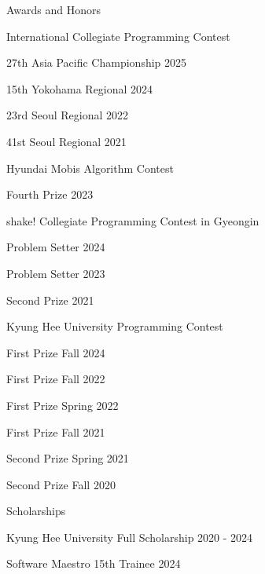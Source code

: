 \documentclass{resume}
\begin{document}
\begin{rSection}{Awards and Honors}

  \begin{rSubsection}{International Collegiate Programming Contest}{}{}{}
    \item 27th \hfill Asia Pacific Championship 2025
    \item 15th \hfill Yokohama Regional 2024
    \item 23rd \hfill Seoul Regional 2022
    \item 41st \hfill Seoul Regional 2021
  \end{rSubsection}

  \begin{rSubsection}{Hyundai Mobis Algorithm Contest}{}{}{}
    \item Fourth Prize \hfill 2023
  \end{rSubsection}

  \begin{rSubsection}{shake! Collegiate Programming Contest in Gyeongin}{}{}{}
    \item Problem Setter \hfill 2024
    \item Problem Setter \hfill 2023
    \item Second Prize \hfill 2021
  \end{rSubsection}

  \begin{rSubsection}{Kyung Hee University Programming Contest}{}{}{}
    \item First Prize \hfill Fall 2024
    \item First Prize \hfill Fall 2022
    \item First Prize \hfill Spring 2022
    \item First Prize \hfill Fall 2021
    \item Second Prize \hfill Spring 2021
    \item Second Prize \hfill Fall 2020
  \end{rSubsection}

  \begin{rSubsection}{Scholarships}{}{}{}
    \item Kyung Hee University Full Scholarship \hfill 2020 - 2024
    \item Software Maestro 15th Trainee \hfill 2024
  \end{rSubsection}


\end{rSection}
\end{document}
